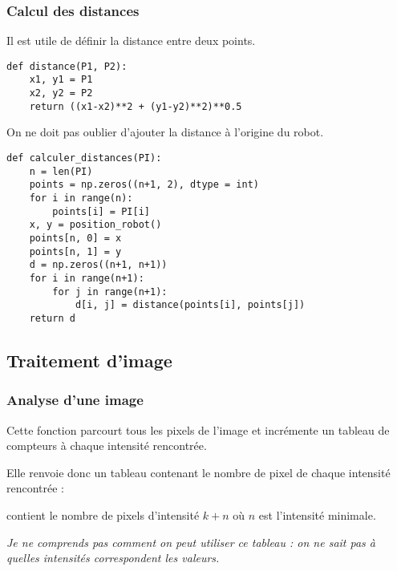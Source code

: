 \subsubsection{Calcul des distances}
\begin{Exercise}[title = {\bf I.A.2)}]
Il est utile de définir la distance entre deux points.
\begin{lstlisting}
def distance(P1, P2):
    x1, y1 = P1
    x2, y2 = P2
    return ((x1-x2)**2 + (y1-y2)**2)**0.5
\end{lstlisting}
On ne doit pas oublier d'ajouter la distance à l'origine du robot.
\begin{lstlisting}
def calculer_distances(PI):
    n = len(PI)    
    points = np.zeros((n+1, 2), dtype = int)
    for i in range(n):
        points[i] = PI[i]
    x, y = position_robot()
    points[n, 0] = x
    points[n, 1] = y
    d = np.zeros((n+1, n+1)) 
    for i in range(n+1):    
        for j in range(n+1):
            d[i, j] = distance(points[i], points[j])   
    return d
\end{lstlisting}
\end{Exercise}
\subsection{Traitement d'image}
\subsubsection{Analyse d'une image}
\begin{Exercise}[title = {\bf I.B.1)}]
Cette fonction parcourt tous les pixels de l'image et incrémente un tableau de compteurs à chaque intensité rencontrée.

Elle renvoie donc un tableau contenant le nombre de pixel de chaque intensité rencontrée  : 

 contient le nombre de pixels d'intensité $k + n$ où $n$ est l'intensité minimale.

{\it Je ne comprends pas comment on peut utiliser ce tableau : on ne sait pas à quelles intensités correspondent les valeurs.}
\end{Exercise}
